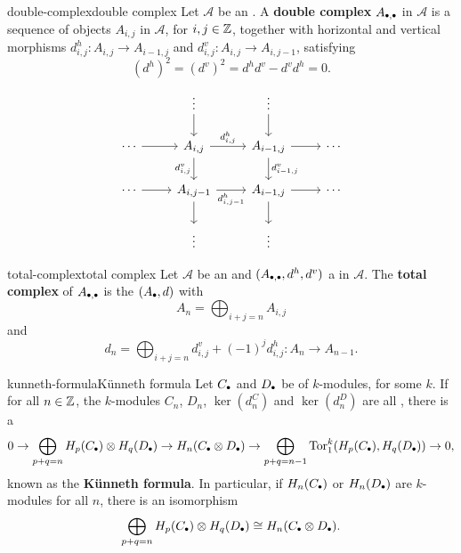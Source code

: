 \begin{topic}{double-complex}{double complex}
    Let $\mathcal{A}$ be an . A \textbf{double complex} $A_{\bdot, \bdot}$ in $\mathcal{A}$ is a sequence of objects $A_{i, j}$ in $\mathcal{A}$, for $i, j \in \mathbb{Z}$, together with horizontal and vertical morphisms $d^h_{i, j} : A_{i, j} \to A_{i - 1, j}$ and $d^v_{i, j} : A_{i, j} \to A_{i, j - 1}$, satisfying
    \[ (d^h)^2 = (d^v)^2 = d^h d^v - d^v d^h = 0 . \]
    \[ \begin{tikzcd}
        & \vdots \arrow{d} & \vdots \arrow{d} & \\
        \cdots \arrow{r} & A_{i, j} \arrow{r}{d^h_{i, j}} \arrow[swap]{d}{d^v_{i, j}} & A_{i - 1, j} \arrow{r} \arrow{d}{d^v_{i - 1, j}} & \cdots \\
        \cdots \arrow{r} & A_{i, j - 1} \arrow[swap]{r}{d^h_{i, j - 1}} \arrow{d} & A_{i - 1, j} \arrow{r} \arrow{d} & \cdots \\
         & \vdots & \vdots & 
    \end{tikzcd} \]
\end{topic}

\begin{topic}{total-complex}{total complex}
    Let $\mathcal{A}$ be an  and $(A_{\bdot, \bdot}, d^h, d^v)$ a  in $\mathcal{A}$. The \textbf{total complex} of $A_{\bdot, \bdot}$ is the  $(A_\bdot, d)$ with
    \[ A_n = \bigoplus_{i + j = n} A_{i, j} \]
    and
    \[ d_n = \bigoplus_{i + j = n} d^v_{i, j} + (-1)^j d^h_{i, j} : A_n \to A_{n - 1} . \]
\end{topic}

\begin{topic}{kunneth-formula}{Künneth formula}
    Let $C_\bdot$ and $D_\bdot$ be  of $k$-modules, for some  $k$. If for all $n \in \mathbb{Z}$, the $k$-modules $C_n$, $D_n$, $\ker(d_n^C)$ and $\ker(d_n^D)$ are all , there is a 
    \[ 0 \to \bigoplus_{p + q = n} H_p(C_\bdot) \otimes H_q(D_\bdot) \to H_n(C_\bdot \otimes D_\bdot) \to \bigoplus_{p + q = n - 1} \textup{Tor}_1^k(H_p(C_\bdot), H_q(D_\bdot)) \to 0 , \]
    known as the \textbf{Künneth formula}. In particular, if $H_n(C_\bdot)$ or $H_n(D_\bdot)$ are  $k$-modules for all $n$, there is an isomorphism
    \[ \bigoplus_{p + q = n} H_p(C_\bdot) \otimes H_q(D_\bdot) \isom H_n(C_\bdot \otimes D_\bdot) . \]
\end{topic}
